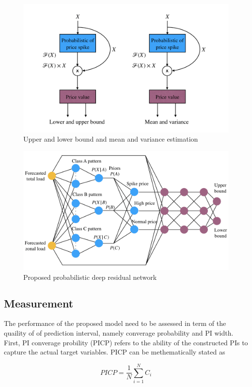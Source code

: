 \documentclass[review]{elsarticle}
\begin{document}
  \begin{figure}[H]
    \caption{Upper and lower bound and mean and variance estimation}
    \label{Fig:UB_LB_MV_PDRN}
    \includegraphics[width=12cm]{UB_LB_MV_PDRN}
  \centering
  \end{figure}

  \begin{figure}[H]
    \caption{Proposed probabilistic deep residual network}
    \label{Fig:proposed_PDRN}
    \includegraphics[width=12cm]{proposed_PDRN}
  \centering
  \end{figure}

  \subsection{Measurement}
    The performance of the proposed model need to be assessed in term of the quaility of of prediction interval, namely converage probability and PI width. First,  PI converage probility (PICP) refers to the ability of the constructed PIs to capture the actual target variables. PICP can be methematically stated as

    \begin{equation}
      PICP = \frac{1}{N} \sum_{i=1}^{N} C_{i}
      \label{eq.PICP}
    \end{equation}
\end{document}
